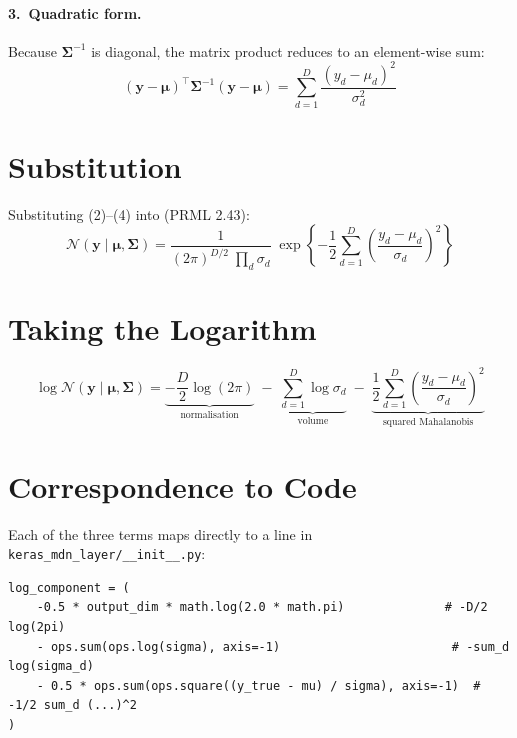 \documentclass[11pt]{article}
\begin{document}
\paragraph{3.\ Quadratic form.}
Because $\boldsymbol{\Sigma}^{-1}$ is diagonal, the matrix product
reduces to an element-wise sum:
\begin{equation}
    (\mathbf{y}-\boldsymbol{\mu})^\top
    \boldsymbol{\Sigma}^{-1}
    (\mathbf{y}-\boldsymbol{\mu})
    = \sum_{d=1}^{D}
      \frac{(y_d - \mu_d)^2}{\sigma_d^2}
\end{equation}

\section*{Substitution}

Substituting (2)--(4) into (PRML 2.43):
\begin{equation}
    \mathcal{N}(\mathbf{y} \mid \boldsymbol{\mu}, \boldsymbol{\Sigma})
    = \frac{1}{(2\pi)^{D/2}\;\prod_{d}\sigma_d}
      \;\exp\!\left\{
        -\frac{1}{2}\sum_{d=1}^{D}
        \left(\frac{y_d - \mu_d}{\sigma_d}\right)^{\!2}
      \right\}
\end{equation}

\section*{Taking the Logarithm}

\begin{equation}
\boxed{
    \log \mathcal{N}(\mathbf{y} \mid \boldsymbol{\mu}, \boldsymbol{\Sigma})
    = \underbrace{-\frac{D}{2}\log(2\pi)}_{\text{normalisation}}
      \;-\; \underbrace{\sum_{d=1}^{D}\log\sigma_d}_{\text{volume}}
      \;-\; \underbrace{\frac{1}{2}\sum_{d=1}^{D}
            \left(\frac{y_d - \mu_d}{\sigma_d}\right)^{\!2}}_{\text{squared Mahalanobis}}
}
\end{equation}

\section*{Correspondence to Code}

Each of the three terms maps directly to a line in
\texttt{keras\_mdn\_layer/\_\_init\_\_.py}:

\begin{verbatim}
log_component = (
    -0.5 * output_dim * math.log(2.0 * math.pi)              # -D/2 log(2pi)
    - ops.sum(ops.log(sigma), axis=-1)                        # -sum_d log(sigma_d)
    - 0.5 * ops.sum(ops.square((y_true - mu) / sigma), axis=-1)  # -1/2 sum_d (...)^2
)
\end{verbatim}
\end{document}
